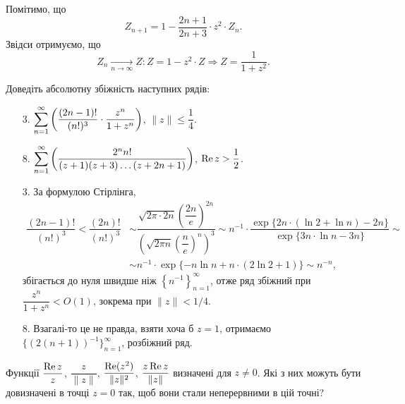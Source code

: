 \begin{solution}
    Помітимо, що 
    \[ Z_{n + 1} = 1 - \dfrac{2n + 1}{2n + 3} \cdot z^2 \cdot Z_n. \]
    Звідси отримуємо, що 
    \[ Z_n \xrightarrow[n \to \infty]{} Z: Z = 1 - z^2 \cdot Z \Rightarrow Z = \dfrac{1}{1 + z^2}. \]
\end{solution}

\begin{problem}[Евграфов, 2.20]
    Доведіть абсолютну збіжність наступних рядів:
    \begin{enumerate}
        \item[3.] $\displaystyle\sum\limits_{n=1}^\infty \left( \dfrac{(2n - 1)!}{(n!)^3} \cdot \dfrac{z^n}{1 + z^n} \right)$, $\|z\| \le \dfrac 14$.
        \item[8.] $\displaystyle\sum\limits_{n=1}^\infty \left( \dfrac{2^n n!}{(z + 1)(z + 3) \ldots(z + 2n + 1)} \right)$, $\operatorname{Re} z > \dfrac 12$.
    \end{enumerate}
\end{problem}

\begin{solution}
    \begin{enumerate}
        \item[3.] За формулою Стірлінга, 
        \begin{align*}
            \dfrac{(2n - 1)!}{(n!)^3} < \dfrac{(2n)!}{(n!)^3} &\sim \dfrac{\sqrt{2\pi \cdot 2n}\left(\dfrac{2n}{e}\right)^{2n}}{\left(\sqrt{2\pi n}\left(\dfrac{n}{e}\right)^{n}\right)^3} \sim n^{-1} \cdot \dfrac{\exp\{2n \cdot(\ln2 + \ln n) - 2n\}}{\exp\{3n \cdot \ln n - 3n\}} \sim \\
            &\sim n^{-1} \cdot \exp\{-n \ln n + n \cdot (2 \ln 2 + 1) \} \sim n^{-n},
        \end{align*} 
        збігається до нуля швидше ніж $\left\{n^{-1}\right\}_{n=1}^\infty$, отже ряд збіжний при $\dfrac{z^n}{1+z^n} < O(1)$, зокрема при $\|z\| < 1 / 4$.
        \item[8.] Взагалі-то це не правда, взяти хоча б $z = 1$, отримаємо $\{ (2(n+1))^{-1} \}_{n=1}^\infty$, розбіжний ряд.
    \end{enumerate}
\end{solution}

\begin{problem}[Волковиський, 126]
    Функції $\dfrac{\operatorname{Re}{z}}{z}$, $\dfrac{z}{\|z\|}$, $\dfrac{\operatorname{Re}(z^2)}{\|z\|^2}$, $\dfrac{z\operatorname{Re}{z}}{\|z\|}$ визначені для $z \ne 0$. Які з них можуть бути довизначені в точці $z = 0$ так, щоб вони стали неперервними в цій точні?
\end{problem}

